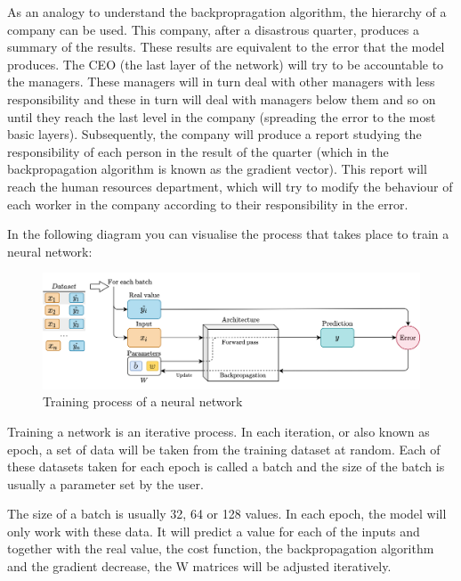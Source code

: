 As an analogy to understand the backpropragation algorithm, the hierarchy of a company can be used. This company, after a disastrous quarter, produces a summary of the results. These results are equivalent to the error that the model produces. The CEO (the last layer of the network) will try to be accountable to the managers. These managers will in turn deal with other managers with less responsibility and these in turn will deal with managers below them and so on until they reach the last level in the company (spreading the error to the most basic layers). Subsequently, the company will produce a report studying the responsibility of each person in the result of the quarter (which in the backpropagation algorithm is known as the gradient vector). This report will reach the human resources department, which will try to modify the behaviour of each worker in the company according to their responsibility in the error.
\newline

In the following diagram you can visualise the process that takes place to train a neural network:
\begin{figure}[H]
    \centering
    \includegraphics[width=15cm]{images/state-of-art/training/training.png}
    \caption{Training process of a neural network}
    \label{fig:error_regression}
\end{figure}

Training a network is an iterative process. In each iteration, or also known as epoch, a set of data will be taken from the training dataset at random. Each of these datasets taken for each epoch is called a batch and the size of the batch is usually a parameter set by the user.
\newline

The size of a batch is usually 32, 64 or 128 values. In each epoch, the model will only work with these data. It will predict a value for each of the inputs and together with the real value, the cost function, the backpropagation algorithm and the gradient decrease, the W matrices will be adjusted iteratively.